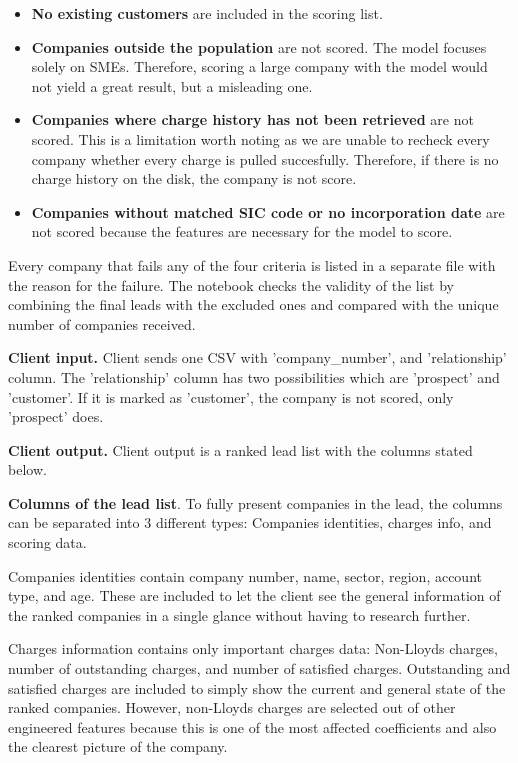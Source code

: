 \documentclass[ %
                    author={Natchalin Iwsakul \\ Inkaphol Siriwongwattana \\ Tanaphan Kummaraphat \\ Patorn Srisupap},
                supervisor={Fernando Moreno-Pino},
                    degree={MSc},
                     title={Propensity Modelling for SME Commercial Lending Using Open Public Data},
                  subtitle={Companies House filings and GDELT media coverage as predictors of first-time borrowing},
                      type={},
                      year={2026}]{dissertation}
\begin{document}
\begin{itemize}
    \item \textbf{No existing customers} are included in the scoring list. 
    \item \textbf{Companies outside the population} are not scored. The model focuses solely on SMEs. Therefore, scoring a large company with the model would not yield a great result, but a misleading one.
    \item \textbf{Companies where charge history has not been retrieved} are not scored. This is a limitation worth noting as we are unable to recheck every company whether every charge is pulled succesfully. Therefore, if there is no charge history on the disk, the company is not score.
    \item \textbf{Companies without matched SIC code or no incorporation date} are not scored because the features are necessary for the model to score.
\end{itemize}

Every company that fails any of the four criteria is listed in a separate file with the reason for the failure. The notebook checks the validity of the list by combining the final leads with the excluded ones and compared with the unique number of companies received.

\textbf{Client input.} Client sends one CSV with 'company\_number', and 'relationship' column. The 'relationship' column has two possibilities which are 'prospect' and 'customer'. If it is marked as 'customer', the company is not scored, only 'prospect' does. 

\textbf{Client output.} Client output is a ranked lead list with the columns stated below.

\textbf{Columns of the lead list}. 
To fully present companies in the lead, the columns can be separated into 3 different types: Companies identities, charges info, and scoring data. 

Companies identities contain company number, name, sector, region, account type, and age. These are included to let the client see the general information of the ranked companies in a single glance without having to research further.

Charges information contains only important charges data: Non-Lloyds charges, number of outstanding charges, and number of satisfied charges. Outstanding and satisfied charges are included to simply show the current and general state of the ranked companies. However, non-Lloyds charges are selected out of other engineered features because this is one of the most affected coefficients and also the clearest picture of the company.
\end{document}
